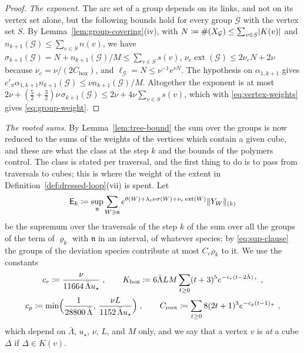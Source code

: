 \documentclass[11pt]{preprint}
\DeclarePairedDelimiter{\abs}{\lvert}{\rvert}
\DeclarePairedDelimiter{\norm}{\lVert}{\rVert}
\numberwithin{equation}{section}
\theoremstyle{definition}
\theoremstyle{remark}
\theoremstyle{plain}
\begin{document}
\begin{proof}
\emph{The exponent.} The arc set of a group depends on its links, and not on its vertex set alone, but the following bounds hold for every group $\mathcal G$ with the vertex set $S$. By Lemma~\ref{lem:group-covering}(iv), with $N \coloneqq \#(X_{\mathcal G}) \leq \sum_{v \in S}\abs{K(v)}$ and $n_{k+1}(\mathcal G) \leq \sum_{v \in S}n(v)$, we have $\sigma_{k+1}(\mathcal G) = N + n_{k+1}(\mathcal G)/M \leq \sum_{v \in S}s(v)$, $\nu_e\operatorname{ext}(\mathcal G) \leq 2\nu_eN + 2\nu$ because $\nu_e = \nu/(2C_{\mathrm{box}})$, and $\ell_{\mathcal G} = N \leq \nu^{-1}e^{\nu N}$. The hypothesis on $\alpha_{1,k+1}$ gives $c'_\pi\alpha_{1,k+1}n_{k+1}(\mathcal G) \leq \nu n_{k+1}(\mathcal G)/M$. Altogether the exponent is at most $2\nu + (\frac52 + \frac32)\nu\,\sigma_{k+1}(\mathcal G) \leq 2\nu + 4\nu\sum_{v \in S}s(v)$, which with \eqref{eq:vertex-weights} gives \eqref{eq:group-weight}.
\end{proof}

\emph{The rooted sums.} By Lemma~\ref{lem:tree-bound} the sum over the groups is now reduced to the sums of the weights of the vertices which contain a given cube, and these are what the class at the step $k$ and the bounds of the polymers control. The class is stated per traversal, and the first thing to do is to pass from traversals to cubes; this is where the weight of the extent in Definition~\ref{def:dressed-loop}(vii) is spent. Let
\begin{equation}\label{eq:old-sum}
    \mathsf E_k \coloneqq \sup_{\mathfrak n}\sum_{W \ni \mathfrak n}e^{\theta(W) + \lambda_c\nu\sigma(W) + \nu_e\operatorname{ext}(W)}\norm{Y_W}_{(k)}
\end{equation}
be the supremum over the traversals of the step $k$ of the sum over all the groups of the term of $\varrho_k$ with $\mathfrak n$ in an interval, of whatever species; by \eqref{eq:sup-clause} the groups of the deviation species contribute at most $C_c\rho_k$ to it. We use the constants
\begin{equation}\label{eq:count-constants}
\begin{gathered}
    c_r \coloneqq \frac{\nu}{11664\,\bar\Lambda u_\star}\;,
    \qquad
    K_{\mathrm{box}} \coloneqq 6\bar\Lambda LM\sum_{t \geq 0}(t + 3)^5e^{-c_r(t - 2\bar\Lambda)_+}\;,\\
    c_p \coloneqq \min\Bigl(\frac{1}{28800\,\bar\Lambda},\, \frac{\nu L}{1152\,\bar\Lambda u_\star}\Bigr)\;,
    \qquad
    C_{\mathrm{root}} \coloneqq \sum_{t \geq 0}8(2t + 1)^3e^{-c_p(t - 1)_+}\;,
\end{gathered}
\end{equation}
which depend on $\bar\Lambda$, $u_\star$, $\nu$, $L$, and $M$ only, and we say that a vertex $v$ is \emph{at} a cube $\Delta$ if $\Delta \in K(v)$.
\end{document}
